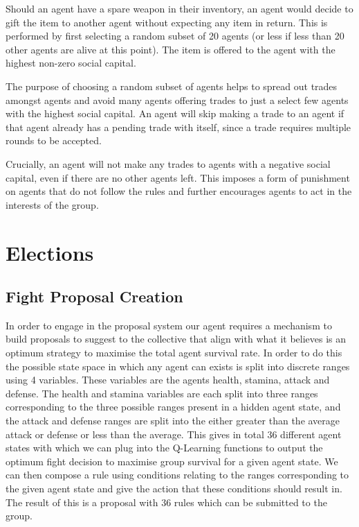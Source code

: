 Should an agent have a spare weapon in their inventory, an agent would decide to gift the item to another agent without expecting any item in return. This is performed by first selecting a random subset of 20 agents (or less if less than 20 other agents are alive at this point). The item is offered to the agent with the highest non-zero social capital.

The purpose of choosing a random subset of agents helps to spread out trades amongst agents and avoid many agents offering trades to just a select few agents with the highest social capital. An agent will skip making a trade to an agent if that agent already has a pending trade with itself, since a trade requires multiple rounds to be accepted.

Crucially, an agent will not make any trades to agents with a negative social capital, even if there are no other agents left. This imposes a form of punishment on agents that do not follow the rules and further encourages agents to act in the interests of the group.

\section{Elections}

\subsection{Fight Proposal Creation}

In order to engage in the proposal system our agent requires a mechanism to build proposals to suggest to the collective that align with what it believes is an optimum strategy to maximise the total agent survival rate. In order to do this the possible state space in which any agent can exists is split into discrete ranges using 4 variables. These variables are the agents health, stamina, attack and defense. The health and stamina variables are each split into three ranges corresponding to the three possible ranges present in a hidden agent state, and the attack and defense ranges are split into the either greater than the average attack or defense or less than the average. This gives in total 36 different agent states with which we can plug into the Q-Learning functions to output the optimum fight decision to maximise group survival for a given agent state. 
We can then compose a rule using conditions relating to the ranges corresponding to the given agent state and give the action that these conditions should result in. The result of this is a proposal with 36 rules which can be submitted to the group.

